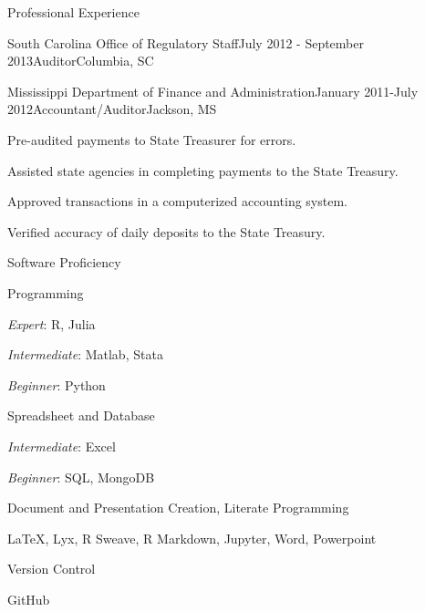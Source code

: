 \documentclass{resume} %
\begin{document}
\begin{rSection}{Professional Experience}
\begin{rSubsection}{South Carolina Office of Regulatory Staff}{July 2012 - September 2013}{Auditor}{Columbia, SC}
\end{rSubsection}

\begin{rSubsection}{Mississippi Department of Finance and Administration}{January 2011-July 2012}{Accountant/Auditor}{Jackson, MS}
    \item Pre-audited payments to State Treasurer for errors.
    \item Assisted state agencies in completing payments to the State Treasury.
    \item Approved transactions in a computerized accounting system.
    \item Verified accuracy of daily deposits to the State Treasury.

\end{rSubsection}
\end{rSection}


\begin{rSection}{Software Proficiency}

\begin{rSubsection}{Programming}{}{}{}
    \item {\em Expert}: R, Julia
    \item {\em Intermediate}: Matlab, Stata 
    \item {\em Beginner}: Python
\end{rSubsection}

\begin{rSubsection}{Spreadsheet and Database}{}{}{}
    \item {\em Intermediate}: Excel 
    \item {\em Beginner}: SQL, MongoDB
\end{rSubsection}

\begin{rSubsection}{Document and Presentation Creation, Literate Programming}{}{}{}
    \item \LaTeX, Lyx, R Sweave, R Markdown, Jupyter, Word, Powerpoint
\end{rSubsection}

\begin{rSubsection}{Version Control}{}{}{}
    \item GitHub
\end{rSubsection}

\end{rSection}
\end{document}
